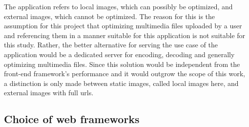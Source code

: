 \documentclass[a4paper, 12pt]{article}
\begin{document}
The application refers to local images, which can possibly be optimized, and external images, which cannot be optimized.
The reason for this is the assumption for this project that optimizing multimedia files uploaded by a user and referencing them in a manner suitable for this application is not suitable for this study.
Rather, the better alternative for serving the use case of the application would be a dedicated server for encoding, decoding and generally optimizing multimedia files.
Since this solution would be independent from the front-end framework's performance and it would outgrow the scope of this work, a distinction is only made between static images, called local images here, and external images with full \acrshort{url}s.

\subsection{Choice of web frameworks}

\end{document}
